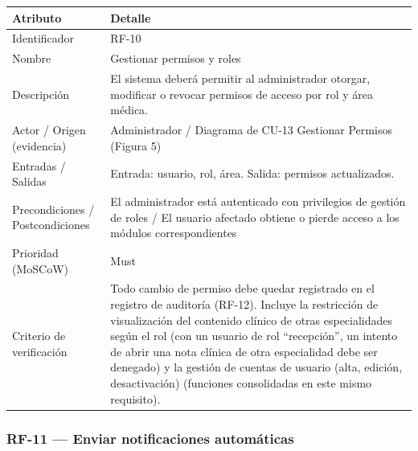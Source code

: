 \documentclass[11pt,a4paper]{article}
\begin{document}
	\begin{longtable}{p{} p{}}
		
		\toprule
		\textbf{Atributo} & \textbf{Detalle} \\
		\midrule
		\endhead
		
		Identificador & RF-10 \\
		Nombre & Gestionar permisos y roles \\
		Descripción & El sistema deberá permitir al administrador otorgar, modificar o revocar permisos de acceso por rol y área médica. \\
		Actor / Origen (evidencia) & Administrador / Diagrama de CU-13 Gestionar Permisos (Figura 5) \\
		Entradas / Salidas & Entrada: usuario, rol, área. Salida: permisos actualizados. \\
		Precondiciones / Postcondiciones & El administrador está autenticado con privilegios de gestión de roles / El usuario afectado obtiene o pierde acceso a los módulos correspondientes \\
		Prioridad (MoSCoW) & Must \\
		Criterio de verificación & Todo cambio de permiso debe quedar registrado en el registro de auditoría (RF-12). Incluye la restricción de visualización del contenido clínico de otras especialidades según el rol (con un usuario de rol ``recepción'', un intento de abrir una nota clínica de otra especialidad debe ser denegado) y la gestión de cuentas de usuario (alta, edición, desactivación) (funciones consolidadas en este mismo requisito). \\
		\bottomrule
	\end{longtable}
	
	\subsubsection{RF-11 --- Enviar notificaciones automáticas}
	
\end{document}
